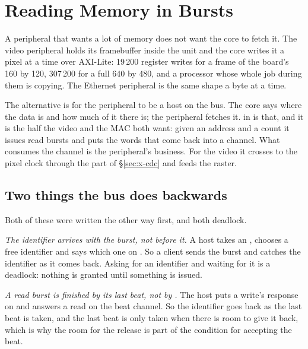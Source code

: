 \section{Reading Memory in Bursts}
\label{sec:x-dma}

A peripheral that wants a lot of memory does not want the core to
fetch it. The video peripheral holds its framebuffer inside the unit
and the core writes it a pixel at a time over AXI-Lite: 19\,200
register writes for a frame of the board's 160 by 120, 307\,200 for
a full 640 by 480, and a processor whose
whole job during them is copying. The Ethernet peripheral is the same
shape a byte at a time.

The alternative is for the peripheral to be a host on the bus. The
core says where the data is and how much of it there is; the
peripheral fetches it.  in  is that,
and it is the half the video and the MAC both want: given an address
and a count it issues read bursts and puts the words that come back
into a channel. What consumes the channel is the peripheral's
business. For the video it crosses to the pixel clock through the
part of \S\ref{sec:x-cdc} and feeds the raster.



\subsection{Two things the bus does backwards}

Both of these were written the other way first, and both deadlock.

\emph{The identifier arrives with the burst, not before it.} A host
takes an , chooses a free identifier and says which one on
. So a client sends the burst and catches the identifier
as it comes back. Asking for an identifier and waiting for it is a
deadlock: nothing is granted until something is issued.

\emph{A read burst is finished by its last beat, not by .}
The host puts a write's response on  and answers a read on
the beat channel. So the identifier goes back as the last beat is
taken, and the last beat is only taken when there is room to give it
back, which is why the room for the release is part of the condition
for accepting the beat.

